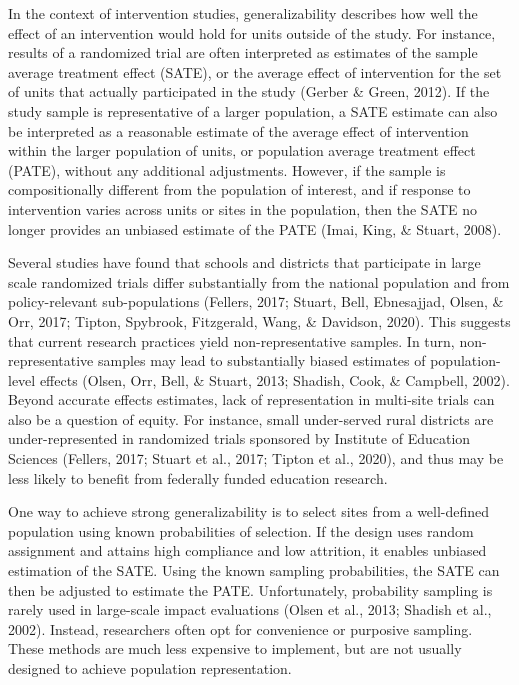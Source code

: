 \documentclass[
  english,
  man,floatsintext]{apa6}
\begin{document}
In the context of intervention studies, generalizability describes how well the effect of an intervention would hold for units outside of the study. For instance, results of a randomized trial are often interpreted as estimates of the sample average treatment effect (SATE), or the average effect of intervention for the set of units that actually participated in the study (Gerber \& Green, 2012). If the study sample is representative of a larger population, a SATE estimate can also be interpreted as a reasonable estimate of the average effect of intervention within the larger population of units, or population average treatment effect (PATE), without any additional adjustments. However, if the sample is compositionally different from the population of interest, and if response to intervention varies across units or sites in the population, then the SATE no longer provides an unbiased estimate of the PATE (Imai, King, \& Stuart, 2008).

Several studies have found that schools and districts that participate in large scale randomized trials differ substantially from the national population and from policy-relevant sub-populations (Fellers, 2017; Stuart, Bell, Ebnesajjad, Olsen, \& Orr, 2017; Tipton, Spybrook, Fitzgerald, Wang, \& Davidson, 2020). This suggests that current research practices yield non-representative samples. In turn, non-representative samples may lead to substantially biased estimates of population-level effects (Olsen, Orr, Bell, \& Stuart, 2013; Shadish, Cook, \& Campbell, 2002). Beyond accurate effects estimates, lack of representation in multi-site trials can also be a question of equity. For instance, small under-served rural districts are under-represented in randomized trials sponsored by Institute of Education Sciences (Fellers, 2017; Stuart et al., 2017; Tipton et al., 2020), and thus may be less likely to benefit from federally funded education research.

One way to achieve strong generalizability is to select sites from a well-defined population using known probabilities of selection. If the design uses random assignment and attains high compliance and low attrition, it enables unbiased estimation of the SATE. Using the known sampling probabilities, the SATE can then be adjusted to estimate the PATE. Unfortunately, probability sampling is rarely used in large-scale impact evaluations (Olsen et al., 2013; Shadish et al., 2002). Instead, researchers often opt for convenience or purposive sampling. These methods are much less expensive to implement, but are not usually designed to achieve population representation.
\end{document}

